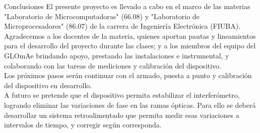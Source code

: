 \documentclass[mathserif]{beamer} %
\begin{document}
\begin{frame}
\begin{columns}[T]
\begin{column}{.475\linewidth}
                \vspace{-3ex}
                \begin{block}{Conclusiones}
                  \justifying
El presente proyecto es llevado a cabo en el marco de las materias "Laboratorio de Microcomputadoras" (66.08) y "Laboratorio de Microprocesadores" (86.07) de la carrera de Ingeniería Electrónica (FIUBA).\\
Agradecemos a los docentes de la materia, quienes aportan pautas y lineamientos para el desarrollo del proyecto durante las clases; y a los miembros del equipo del GLOmAe brindando apoyo, prestando las instalaciones e instrumental, y colaborando con las tareas de mediciones y calibración del dispositivo. \\
Los próximos pasos serán continuar con el armado, puesta a punto y calibración del dispositivo en desarrollo. \\
A futuro se pretende que el dispositivo permita estabilizar el interferómetro, logrando eliminar las variaciones de fase en las ramas ópticas. Para ello se deberá desarrollar un sistema retroalimentado que permita medir esas variaciones a intervalos de tiempo, y corregir según corresponda.

                \end{block}


              \end{column}

            \end{columns} 

          \end{frame}

          
\end{document}
